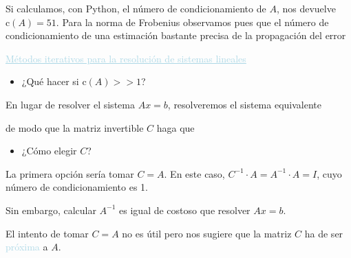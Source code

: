 \documentclass[12pt]{article}
\begin{document}
Si calculamos, con Python, el número de condicionamiento de $A$, nos devuelve $\mathrm{c}(A)=51$. Para la norma de Frobenius observamos pues que el número de condicionamiento de una estimación bastante precisa de la propagación del error

\textcolor{lightblue}{\underline{Métodos iterativos para la resolución de sistemas lineales}}
\begin{itemize}[label=\color{red}\textbullet, leftmargin=*]
    \item \color{lightblue} ¿Qué hacer si $\mathrm{c}(A)>>1$?
\end{itemize}
En lugar de resolver el sistema $Ax=b$, resolveremos el sistema equivalente \begin{center}
\end{center} de modo que la matriz invertible $C$ haga que \begin{center}
\end{center}
\begin{itemize}[label=\color{red}\textbullet, leftmargin=*]
    \item \color{lightblue}¿Cómo elegir $C$?
\end{itemize}
La primera opción sería tomar $C=A$. En este caso, $C^{-1}\cdot A=A^{-1}\cdot A=I$, cuyo número de condicionamiento es 1.

Sin embargo, calcular $A^{-1}$ es igual de costoso que resolver $Ax=b$.

El intento de tomar $C=A$ no es útil pero nos sugiere que la matriz $C$ ha de ser \textcolor{lightblue}{próxima} a $A$.
\end{document}
